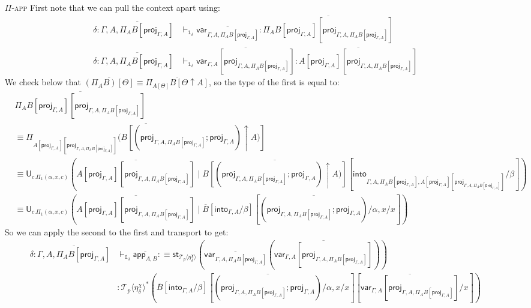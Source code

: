 \documentclass[10pt]{article}
\theoremstyle{definition}
\newcommand{\yields}{\vdash}
\newcommand\U[3]{\ensuremath{\mathsf{U}_{#1}(#2 \mid #3)}}
\newcommand\St[2]{\ensuremath{{#1}^*(#2)}}
\newcommand\StI[2]{\ensuremath{\mathsf{st}_{#1}(#2)}}
\newcommand\ApEl[2]{\mathcal{T}_{#1}\langle#2\rangle}
\newcommand{\upstairs}[1]{\overline{#1}}
\newcommand\proj[1]{\ensuremath{\mathsf{proj}_{#1}}}
\newcommand\qvar[1]{\ensuremath{\mathsf{var}_{#1}}}
\newcommand\into[1]{\ensuremath{\mathsf{into}_{#1}}}
\newcommand\One{\ensuremath{\mathds{1}}}
\newcommand\qapp[1]{\ensuremath{\mathsf{app}_{#1}}}
\begin{document}
\begin{enumerate}
\item[\textsc{$\Pi$-app}] First note that we can pull the context apart using:
\begin{align*}
\delta : \upstairs{\Gamma, A, \Pi_A B[\proj{\Gamma, A}]} &\yields_{\One_\delta} \upstairs{\qvar{\Gamma, A, \Pi_A B[\proj{\Gamma, A}]}} : \upstairs{\Pi_A B[\proj{\Gamma, A}][\proj{\Gamma, A, \Pi_A B[\proj{\Gamma, A}]}]} \\ 
\delta : \upstairs{\Gamma, A, \Pi_A B[\proj{\Gamma, A}]} &\yields_{\One_\delta} \upstairs{\qvar{\Gamma, A}[\proj{\Gamma, A, \Pi_A B[\proj{\Gamma, A}]}]} : \upstairs{A[\proj{\Gamma, A}][\proj{\Gamma, A, \Pi_A B[\proj{\Gamma, A}]}]} 
\end{align*}
We check below that $\upstairs{(\Pi_A B)[\Theta]} \equiv \upstairs{\Pi_{A[\Theta]} B[\Theta \uparrow A]}$, so the type of the first is equal to:
\begin{align*}
&\upstairs{\Pi_A B[\proj{\Gamma, A}][\proj{\Gamma, A, \Pi_A B[\proj{\Gamma, A}]}]} \\
&\equiv \upstairs{\Pi_{A[\proj{\Gamma, A}][\proj{\Gamma, A, \Pi_A B[\proj{\Gamma, A}]}]} (B[(\proj{\Gamma, A, \Pi_A B[\proj{\Gamma, A}]};\proj{\Gamma, A}) \uparrow A)]} \\
&\equiv \U{c. \Pi_1(\alpha,x,c)}{\upstairs{A[\proj{\Gamma, A}][\proj{\Gamma, A, \Pi_A B[\proj{\Gamma, A}]}]}}{\upstairs{B[(\proj{\Gamma, A, \Pi_A B[\proj{\Gamma, A}]};\proj{\Gamma, A}) \uparrow A)]}[\into{\Gamma, A, \Pi_A B[\proj{\Gamma, A}], A[\proj{\Gamma, A}][\proj{\Gamma, A, \Pi_A B[\proj{\Gamma, A}]}]}/\beta]} \\
&\equiv \U{c. \Pi_1(\alpha,x,c)}{\upstairs{A[\proj{\Gamma, A}][\proj{\Gamma, A, \Pi_A B[\proj{\Gamma, A}]}]}}{\upstairs{B}[\into{\Gamma, A}/\beta][\upstairs{(\proj{\Gamma, A, \Pi_A B[\proj{\Gamma, A}]};\proj{\Gamma, A})}/\alpha, x/x]}
\end{align*}
So we can apply the second to the first and transport to get:
\begin{align*}
\delta : \upstairs{\Gamma, A, \Pi_A B[\proj{\Gamma, A}]} &\yields_{\One_\delta} \upstairs{\qapp{A,B}} :\equiv \StI{\ApEl{p}{\eta^\chi_\delta}}{\upstairs{\qvar{\Gamma, A, \Pi_A B[\proj{\Gamma, A}]}}(\upstairs{\qvar{\Gamma, A}[\proj{\Gamma, A, \Pi_A B[\proj{\Gamma, A}]}]})} \\&: \St{\ApEl{p}{\eta^\chi_\delta}}{\upstairs{B}[\into{\Gamma, A}/\beta][\upstairs{(\proj{\Gamma, A, \Pi_A B[\proj{\Gamma, A}]};\proj{\Gamma, A})}/\alpha, x/x][\upstairs{\qvar{\Gamma, A}[\proj{\Gamma, A, \Pi_A B[\proj{\Gamma, A}]}]}/x]}
\end{align*}

\end{enumerate}
\end{document}
